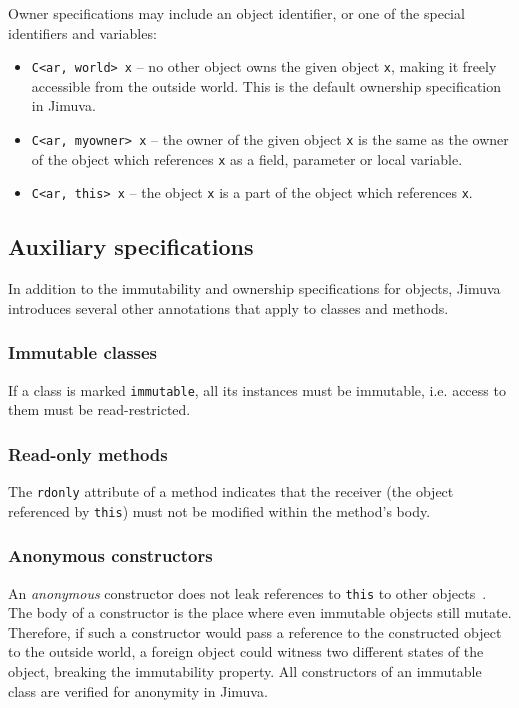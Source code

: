 \documentclass{pracamgr}
\theoremstyle{all}
\begin{document}
Owner specifications may include an object identifier, or one of the
special identifiers and variables:
\begin{itemize}
\item \texttt{C<ar, world> x} -- no other object owns the given object
  \texttt{x}, making it freely accessible from the outside world. This
  is the default ownership specification in Jimuva.
\item \texttt{C<ar, myowner> x} -- the owner of the given object
  \texttt{x} is the same as the owner of the object which references
  \texttt{x} as a field, parameter or local variable.
\item \texttt{C<ar, this> x} -- the object \texttt{x} is a part of the 
  object which references \texttt{x}. 
\end{itemize}

\subsection{Auxiliary specifications}
\label{sub:jimuva-aux}

In addition to the immutability and ownership specifications for
objects, Jimuva introduces several other annotations that apply to
classes and methods.

\subsubsection{Immutable classes}

If a class is marked \texttt{immutable}, all its instances must be
immutable, i.e. access to them must be read-restricted.

\subsubsection{Read-only methods}

The \texttt{rdonly} attribute of a method indicates that the receiver
(the object referenced by \texttt{this}) must not be modified within
the method's body.

\subsubsection{Anonymous constructors}

An \emph{anonymous} constructor does not leak references to
\texttt{this} to other objects~\cite{vitek}. The body of a constructor
is the place where even immutable objects still mutate. Therefore, if
such a constructor would pass a reference to the constructed object to
the outside world, a foreign object could witness two different states
of the object, breaking the immutability property. All constructors of
an immutable class are verified for anonymity in
Jimuva.
\end{document}
